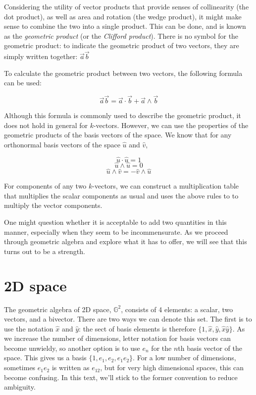 Considering the utility of vector products that provide senses of collinearity (the dot product),
as well as area and rotation (the wedge product), it might make sense to combine the two into a 
single product. This can be done, and is known as the \textit{geometric product} (or the 
\textit{Clifford product}). There is no symbol for the geometric product: to indicate the geometric
product of two vectors, they are simply written together: $\vec{a}\vec{b}$

To calculate the geometric product between two vectors, the following formula can be used:

$$\vec{a}\vec{b} = \vec{a} \cdot \vec{b} + \vec{a} \wedge \vec{b}$$

Although this formula is commonly used to describe the geometric product, it does not hold in 
general for $k$-vectors. However, we can use the properties of the geometric products of the basis
vectors of the space. We know that for any orthonormal basis vectors of the space $\hat{u}$ and 
$\hat{v}$,

$$\hat{u} \cdot \hat{u} = 1$$
$$\hat{u} \wedge \hat{u} = 0$$
$$\hat{u} \wedge \hat{v} = -\hat{v} \wedge \hat{u}$$

For components of any two $k$-vectors, we can construct a multiplication table that multiplies the
scalar components as usual and uses the above rules to to multiply the vector components.

One might question whether it is acceptable to add two quantities in this manner, especially when
they seem to be incommensurate. As we proceed through geometric algebra and explore what it has to
offer, we will see that this turns out to be a strength.

\section{2D space}

The geometric algebra of 2D space, $\mathbb{G}^2$, consists of 4 elements: a scalar, two vectors,
and a bivector. There are two ways we can denote this set. The first is to use the notation
$\hat{x}$ and $\hat{y}$: the sect of basis elements is therefore $\{1, \hat{x}, \hat{y}, 
\hat{x}\hat{y}\}$. As we increase the number of dimensions, letter notation for basis vectors can
become unwieldy, so another option is to use $e_{n}$ for the $n$th basis vector of the space. 
This gives us a basis $\{1, e_1, e_2, e_{1}e_{2}\}$. For a low number of dimensions, sometimes
$e_{1}e_{2}$ is written as $e_12$, but for very high dimensional spaces, this can become confusing.
In this text, we'll stick to the former convention to reduce ambiguity.

